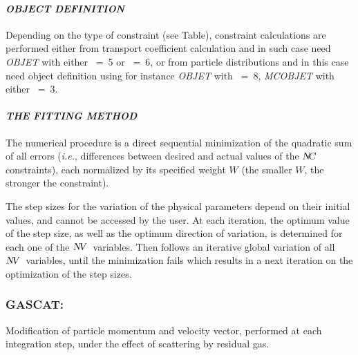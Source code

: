 \paragraph{\textit{OBJECT DEFINITION}}


Depending on the type of constraint (see Table), constraint calculations are performed either from 
transport coefficient calculation and in such case need  \textsl{OBJET} with either \KOBJ~=~5  
or  \KOBJ~=~6, or from particle distributions and in this case need  object definition using for 
instance \textsl{OBJET} with \KOBJ~=~8,    \textsl{MCOBJET} with either \KOBJ~=~3. 



\smallskip

\paragraph{\textit{THE FITTING METHOD \protect\cite{Biblio10}}}    %

\noindent The numerical procedure is a direct sequential minimization of the quadratic
sum of all errors (\emph{i.e.}, differences between desired and actual values of the $\textsl{N\!C }$ 
constraints), each normalized by its specified weight $ W $ (the smaller $ W$,
the stronger the constraint). 

\noindent The step sizes for the variation of the physical parameters depend
on their initial  values, and cannot be accessed by the user. At each iteration, the 
optimum value of the step size, as well as the optimum direction of variation,
is determined for each one of the $\textsl{N\!V }$ variables. Then follows an iterative
global variation of all $\textsl{N\!V }$ variables, until the minimization fails which results in a
next iteration on the optimization of the step sizes. 

\newpage

\subsubsection*{GASCAT: \GASCATTitl} \label{GASCAT}
\medskip

Modification of particle momentum and velocity vector, performed at each integration step, 
under the effect of scattering by residual gas.

